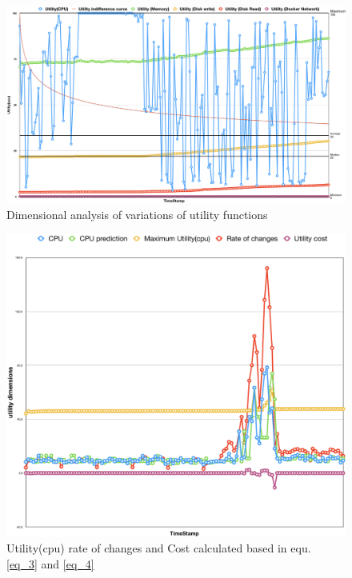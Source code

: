 \documentclass[sigconf]{acmart}
\begin{document}
\begin{figure}[!ht] 
\includegraphics[scale=0.2]{demand}
\caption{ Dimensional analysis of variations of utility functions}
\label{fig_demand}
\end{figure}
\begin{figure}[!ht] 
\includegraphics[scale=0.23]{changes}
\caption{Utility(cpu) rate of changes and Cost calculated based in equ. \ref{eq_3} and \ref{eq_4}}
\label{fig_changes}
\end{figure}
\end{document}
